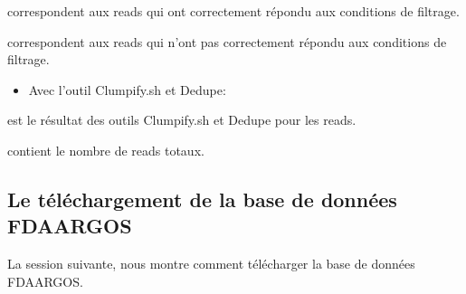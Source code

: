 \documentclass[letterpaper,10pt,french]{sphinxmanual}
\begin{document}
\begin{sphinxVerbatim}[commandchars=\\\{\}]
\end{sphinxVerbatim}

 correspondent aux reads qui ont correctement répondu aux conditions de filtrage.

\begin{sphinxVerbatim}[commandchars=\\\{\}]
\end{sphinxVerbatim}

 correspondent aux reads qui n’ont pas correctement répondu aux conditions de filtrage.
\begin{itemize}
\item {} 
Avec l’outil Clumpify.sh et Dedupe:

\end{itemize}

\begin{sphinxVerbatim}[commandchars=\\\{\}]
 
\end{sphinxVerbatim}

 est le résultat des outils Clumpify.sh et Dedupe pour les reads.

\begin{sphinxVerbatim}[commandchars=\\\{\}]
\end{sphinxVerbatim}

 contient le nombre de reads totaux.


\subsection{Le téléchargement de la base de données FDA\sphinxhyphen{}ARGOS}
\label{\detokenize{tutorial:le-telechargement-de-la-base-de-donnees-fda-argos}}\label{\detokenize{tutorial:download-fda-argos}}
La session suivante, nous montre comment télécharger la base de données FDA\sphinxhyphen{}ARGOS.
\end{document}
